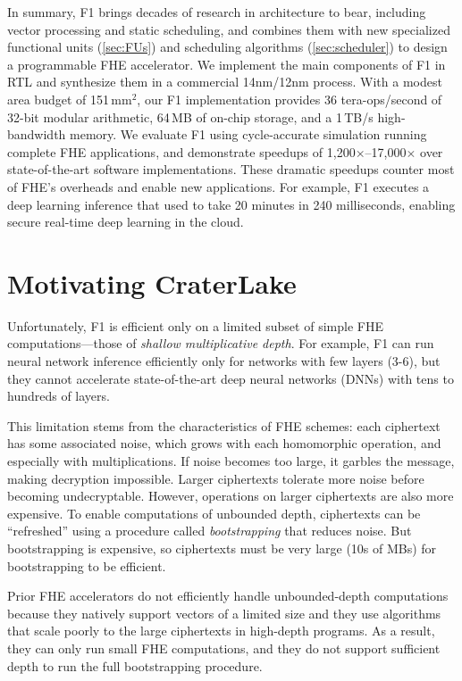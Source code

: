 In summary, F1 brings decades of research in architecture to bear, including
vector processing and static scheduling, and combines them with new specialized
functional units (\autoref{sec:FUs}) and scheduling algorithms
(\autoref{sec:scheduler}) to design a programmable FHE accelerator. We
implement the main components of F1 in RTL and synthesize them in a commercial
14nm/12nm process. With a modest area budget of 151\,mm$^2$, our F1
implementation provides 36 tera-ops/second of 32-bit modular arithmetic, 64\,MB
of on-chip storage, and a 1\,TB/s high-bandwidth memory. We evaluate F1 using
cycle-accurate simulation running complete FHE applications, and demonstrate
speedups of 1,200$\times$--17,000$\times$ over state-of-the-art software
implementations. These dramatic speedups counter most of FHE's overheads and
enable new applications. For example, F1 executes a deep learning inference
that used to take 20 minutes in 240 milliseconds, enabling secure real-time
deep learning in the cloud.

\section{Motivating CraterLake}

Unfortunately, F1 is efficient only on a limited subset of simple FHE
computations---those of \emph{shallow multiplicative depth}. For example, F1
can run neural network inference efficiently only for networks with few layers
(3-6), but they cannot accelerate state-of-the-art deep neural networks (DNNs)
with tens to hundreds of layers.

This limitation stems from the characteristics of FHE schemes: each ciphertext
has some associated noise, which grows with each homomorphic operation, and
especially with multiplications. If noise becomes too large, it garbles the
message, making decryption impossible. Larger ciphertexts tolerate more noise
before becoming undecryptable. However, operations on larger ciphertexts are
also more expensive. To enable computations of unbounded depth, ciphertexts can
be ``refreshed'' using a procedure called \emph{bootstrapping} that reduces
noise. But bootstrapping is expensive, so ciphertexts must be very large (10s
of MBs) for bootstrapping to be efficient.

Prior FHE accelerators do not efficiently handle unbounded-depth computations
because they natively support vectors of a limited size and they use algorithms
that scale poorly to the large ciphertexts in high-depth programs. As a result,
they can only run small FHE computations, and they do not support sufficient
depth to run the full bootstrapping procedure.

